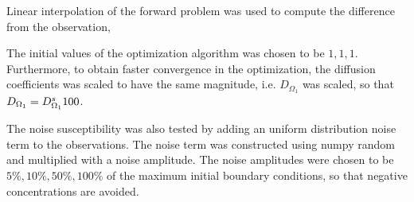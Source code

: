 \documentclass[11pt,a4paper]{article}
\begin{document}
Linear interpolation of the forward problem was used to compute the difference from the observation,

The initial values of the optimization algorithm was chosen to be $1,1,1$. Furthermore, to obtain faster convergence in the optimization, the diffusion coefficients was scaled to have the same magnitude, i.e.  $D_{\Omega_1}$ was scaled, so that $D_{\Omega_1} = D\sp {s}_{\Omega_1}100$.     


The noise susceptibility was also tested by adding an uniform distribution noise term to the observations. The noise term was constructed using numpy random and multiplied with a noise amplitude. The noise amplitudes were chosen to be $ 5\%, 10\%, 50\%, 100\%$ of the maximum initial boundary conditions, so that negative concentrations are avoided.  
\end{document}
